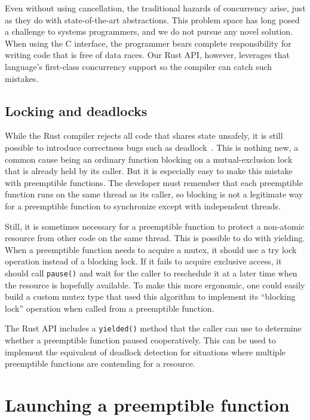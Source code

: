 Even without using cancellation, the traditional hazards of concurrency arise, just
as they do with state-of-the-art abstractions.  This problem space has long posed a
challenge to systems programmers, and we do not pursue any novel solution.  When
using the C interface, the programmer bears complete responsibility for writing code
that is free of data races.  Our Rust API, however, leverages that language's
first-class concurrency support so the compiler can catch such mistakes.


\subsection{Locking and deadlocks}
\label{sec:libinger:locks}

While the Rust compiler rejects all code that shares state unsafely, it is still
possible to introduce correctness bugs such as deadlock~\cite{www-rustlang-nu}.  This
is nothing new, a common cause being an ordinary function blocking on a
mutual-exclusion lock that is already held by its caller.  But it is especially easy
to make this mistake with preemptible functions.  The developer must remember that
each preemptible function runs on the same thread as its caller, so blocking is not a
legitimate way for a preemptible function to synchronize except with independent
threads.

Still, it is sometimes necessary for a preemptible function to protect a non-atomic
resource from other code on the same thread.  This is possible to do with yielding.
When a preemptible function needs to acquire a mutex, it should use a try lock
operation instead of a blocking lock.  If it fails to acquire exclusive access, it
should call \texttt{pause()} and wait for the caller to reschedule it at a later time
when the resource is hopefully available.  To make this more ergonomic, one could
easily build a custom mutex type that used this algorithm to implement its ``blocking
lock'' operation when called from a preemptible function.

The Rust API includes a \texttt{yielded()} method that the caller can use to
determine whether a preemptible function paused cooperatively.  This can be used to
implement the equivalent of deadlock detection for situations where multiple
preemptible functions are contending for a resource.


\section{Launching a preemptible function}

